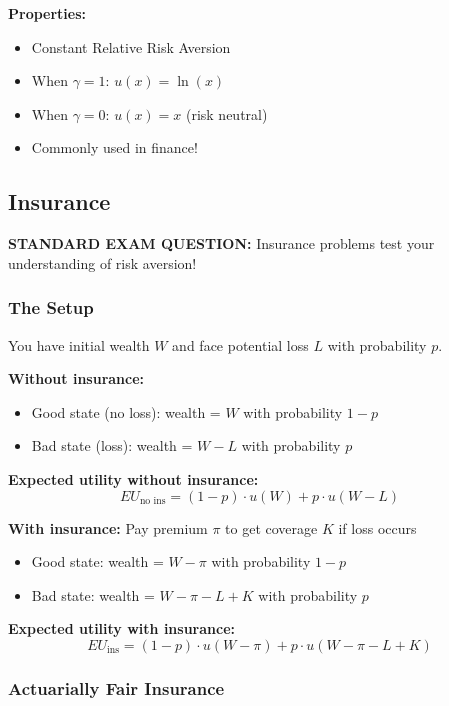 \documentclass[10pt,letterpaper]{article}
\begin{document}
\textbf{Properties:}
\begin{itemize}
  \item Constant Relative Risk Aversion
  \item When $\gamma = 1$: $u(x) = \ln(x)$
  \item When $\gamma = 0$: $u(x) = x$ (risk neutral)
  \item Commonly used in finance!
\end{itemize}

\subsection{Insurance}

\begin{criticalbox}
\textbf{STANDARD EXAM QUESTION:} Insurance problems test your understanding of risk aversion!
\end{criticalbox}

\subsubsection{The Setup}

You have initial wealth $W$ and face potential loss $L$ with probability $p$.

\textbf{Without insurance:}
\begin{itemize}
  \item Good state (no loss): wealth = $W$ with probability $1-p$
  \item Bad state (loss): wealth = $W - L$ with probability $p$
\end{itemize}

\textbf{Expected utility without insurance:}
\[
EU_{\text{no ins}} = (1-p) \cdot u(W) + p \cdot u(W-L)
\]

\textbf{With insurance:} Pay premium $\pi$ to get coverage $K$ if loss occurs
\begin{itemize}
  \item Good state: wealth = $W - \pi$ with probability $1-p$
  \item Bad state: wealth = $W - \pi - L + K$ with probability $p$
\end{itemize}

\textbf{Expected utility with insurance:}
\[
EU_{\text{ins}} = (1-p) \cdot u(W-\pi) + p \cdot u(W-\pi-L+K)
\]

\subsubsection{Actuarially Fair Insurance}
\end{document}
